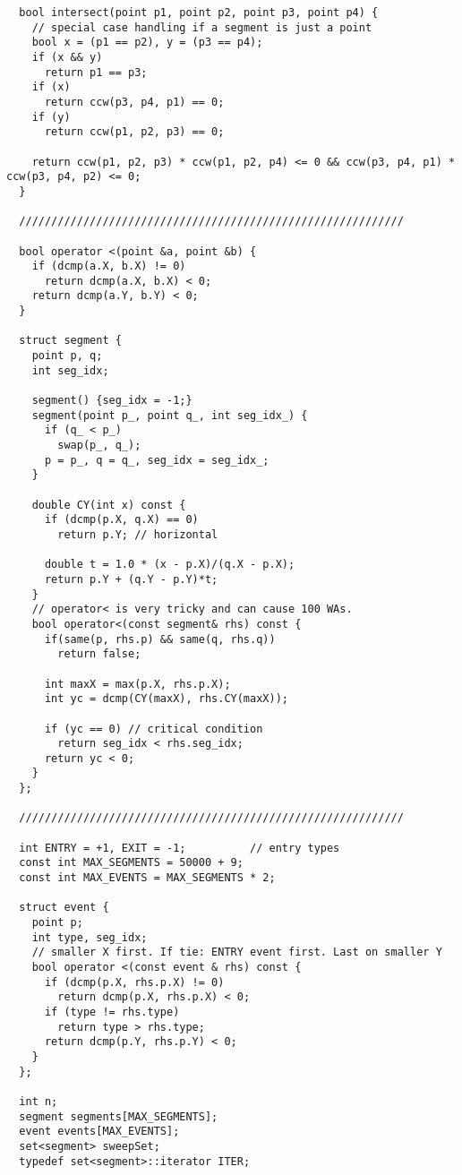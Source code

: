 \documentclass{article}
\begin{document}
\begin{verbatim}
  bool intersect(point p1, point p2, point p3, point p4) {
    // special case handling if a segment is just a point
    bool x = (p1 == p2), y = (p3 == p4);
    if (x && y)
      return p1 == p3;
    if (x)
      return ccw(p3, p4, p1) == 0;
    if (y)
      return ccw(p1, p2, p3) == 0;

    return ccw(p1, p2, p3) * ccw(p1, p2, p4) <= 0 && ccw(p3, p4, p1) * ccw(p3, p4, p2) <= 0;
  }

  ////////////////////////////////////////////////////////////

  bool operator <(point &a, point &b) {
    if (dcmp(a.X, b.X) != 0)
      return dcmp(a.X, b.X) < 0;
    return dcmp(a.Y, b.Y) < 0;
  }

  struct segment {
    point p, q;
    int seg_idx;

    segment() {seg_idx = -1;}
    segment(point p_, point q_, int seg_idx_) {
      if (q_ < p_)
        swap(p_, q_);
      p = p_, q = q_, seg_idx = seg_idx_;
    }

    double CY(int x) const {
      if (dcmp(p.X, q.X) == 0)
        return p.Y; // horizontal

      double t = 1.0 * (x - p.X)/(q.X - p.X);
      return p.Y + (q.Y - p.Y)*t;
    }
    // operator< is very tricky and can cause 100 WAs.
    bool operator<(const segment& rhs) const {
      if(same(p, rhs.p) && same(q, rhs.q))
        return false;

      int maxX = max(p.X, rhs.p.X);
      int yc = dcmp(CY(maxX), rhs.CY(maxX));

      if (yc == 0) // critical condition
        return seg_idx < rhs.seg_idx;
      return yc < 0;
    }
  };

  ////////////////////////////////////////////////////////////

  int ENTRY = +1, EXIT = -1;          // entry types
  const int MAX_SEGMENTS = 50000 + 9;
  const int MAX_EVENTS = MAX_SEGMENTS * 2;

  struct event {
    point p;
    int type, seg_idx;
    // smaller X first. If tie: ENTRY event first. Last on smaller Y
    bool operator <(const event & rhs) const {
      if (dcmp(p.X, rhs.p.X) != 0)
        return dcmp(p.X, rhs.p.X) < 0;
      if (type != rhs.type)
        return type > rhs.type;
      return dcmp(p.Y, rhs.p.Y) < 0;
    }
  };

  int n;
  segment segments[MAX_SEGMENTS];
  event events[MAX_EVENTS];
  set<segment> sweepSet;
  typedef set<segment>::iterator ITER;


\end{verbatim}
\end{document}
